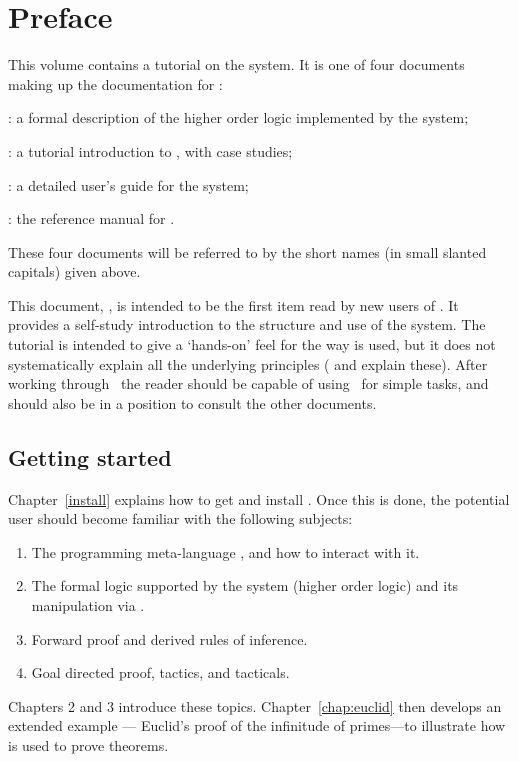 \chapter*{Preface}
\label{intro}

This volume contains a tutorial on the \HOL{} system.  It is one of four
documents making up the documentation for \HOL:

\begin{myenumerate}
\item \LOGIC: a formal description of the higher order logic
  implemented by the \HOL{} system;
\item \TUTORIAL: a tutorial introduction to \HOL, with case studies;
\item \DESCRIPTION: a detailed user's guide for the \HOL{} system;
\item \REFERENCE: the reference manual for \HOL.
\end{myenumerate}

\noindent These four documents will be referred to by the short names (in
small slanted capitals) given above.

This document, \TUTORIAL, is intended to be the first item read by new
users of \HOL.  It provides a self-study introduction to the structure
and use of the system.  The tutorial is intended to give a `hands-on'
feel for the way \HOL{} is used, but it does not systematically
explain all the underlying principles (\DESCRIPTION{} and \LOGIC{}
explain these).  After working through \TUTORIAL\ the reader should be
capable of using \HOL\ for simple tasks, and should also be in a
position to consult the other documents.

\section*{Getting started}

Chapter~\ref{install} explains how to get and install \HOL.  Once this
is done, the potential \HOL{} user should become familiar with the
following subjects:
%
\begin{enumerate}
\item The programming meta-language \ML, and how to interact with it.
\item The formal logic supported by the \HOL{} system (higher order
  logic) and its manipulation via \ML.
\item Forward proof and derived rules of inference.
\item Goal directed proof, tactics, and tacticals.
\end{enumerate}
%
Chapters 2 and 3 introduce these topics.
Chapter~\ref{chap:euclid} then develops an extended example --- Euclid's
proof of the infinitude of primes---to illustrate how \HOL{} is used
to prove theorems.


